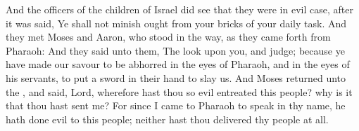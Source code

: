 \begin{biblechapter}
\verse And the officers of the children of Israel did see that they were in evil case, after it was said, Ye shall not minish ought from your bricks of your daily task.
\verse And they met Moses and Aaron, who stood in the way, as they came forth from Pharaoh:
\verse And they said unto them, The \LORD look upon you, and judge; because ye have made our savour to be abhorred in the eyes of Pharaoh, and in the eyes of his servants, to put a sword in their hand to slay us.
 And Moses returned unto the \LORD, and said, Lord, wherefore hast thou so evil entreated this people? why is it that thou hast sent me?
\verse For since I came to Pharaoh to speak in thy name, he hath done evil to this people; neither hast thou delivered thy people at all.
\end{biblechapter}

